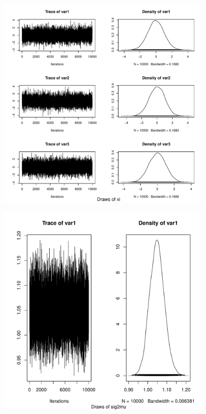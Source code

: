 \documentclass[10pt]{article}
\begin{document}
\begin{figure}
\centering
\includegraphics[width=0.95\textwidth]{figures/diag-xi.pdf}
\caption{}
\label{fig:diag-xi}
\end{figure}

\begin{figure}
\centering
\includegraphics[width=0.95\textwidth]{figures/diag-sig2mu.pdf}
\caption{}
\label{fig:diag-sig2mu}
\end{figure}
\end{document}
